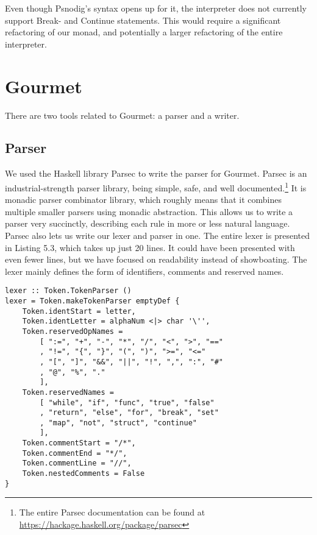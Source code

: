 Even though Psnodig's syntax opens up for it, the interpreter does not currently support Break- and Continue statements. This would require a significant refactoring of our monad, and potentially a larger refactoring of the entire interpreter. \hfill \\


\section{Gourmet}

There are two tools related to Gourmet: a parser and a writer. 

\subsection{Parser}

We used the Haskell library Parsec to write the parser for Gourmet. Parsec is an industrial-strength parser library, being simple, safe, and well documented.\footnote{The entire Parsec documentation can be found at \url{https://hackage.haskell.org/package/parsec}} It is monadic parser combinator library, which roughly means that it combines multiple smaller parsers using monadic abstraction. This allows us to write a parser very succinctly, describing each rule in more or less natural language. \hfill \\

Parsec also lets us write our lexer and parser in one. The entire lexer is presented in Listing 5.3, which takes up just 20 lines. It could have been presented with even fewer lines, but we have focused on readability instead of showboating. The lexer mainly defines the form of identifiers, comments and reserved names. \hfill \\

\begin{lstlisting}[caption={The Gourmet lexer}, captionpos=b]
lexer :: Token.TokenParser ()
lexer = Token.makeTokenParser emptyDef {
    Token.identStart = letter,
    Token.identLetter = alphaNum <|> char '\'',
    Token.reservedOpNames =
        [ ":=", "+", "-", "*", "/", "<", ">", "=="
        , "!=", "{", "}", "(", ")", ">=", "<="
        , "[", "]", "&&", "||", "!", ",", ":", "#"
        , "@", "%", "."
        ],
    Token.reservedNames =
        [ "while", "if", "func", "true", "false"
        , "return", "else", "for", "break", "set"
        , "map", "not", "struct", "continue"
        ],
    Token.commentStart = "/*",
    Token.commentEnd = "*/",
    Token.commentLine = "//",
    Token.nestedComments = False
}
\end{lstlisting}


